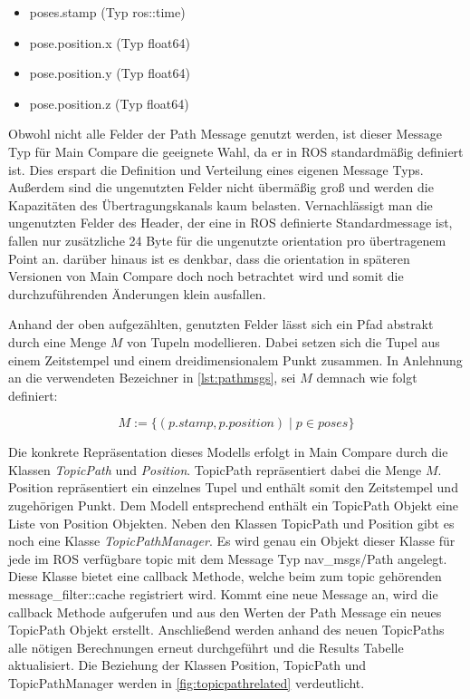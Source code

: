 \begin{itemize}
  \item poses.stamp (Typ ros::time)
  \item pose.position.x (Typ float64)
  \item pose.position.y (Typ float64)
  \item pose.position.z (Typ float64)
\end{itemize}

Obwohl nicht alle Felder der Path Message genutzt werden, ist dieser Message Typ
für Main Compare die geeignete Wahl, da er in ROS standardmäßig
definiert ist. Dies erspart die Definition und Verteilung eines
eigenen Message Typs. Außerdem sind die ungenutzten Felder nicht
übermäßig groß und werden die Kapazitäten des Übertragungskanals kaum belasten.
Vernachlässigt man die ungenutzten Felder des Header, der eine in ROS definierte Standardmessage ist, fallen nur
zusätzliche 24 Byte für die ungenutzte orientation pro übertragenem Point an.
darüber hinaus ist es denkbar, dass die orientation in späteren Versionen von
Main Compare doch noch betrachtet wird und somit die durchzuführenden
Änderungen klein ausfallen.

Anhand der oben aufgezählten, genutzten Felder lässt sich ein Pfad abstrakt durch eine Menge
$M$ von Tupeln modellieren. Dabei setzen sich die Tupel aus einem Zeitstempel und einem dreidimensionalem
Punkt zusammen. In Anlehnung an die verwendeten Bezeichner in
\autoref{lst:pathmsgs}, sei $M$ demnach wie folgt definiert:

\begin{equation*}
  \label{eqn:setdef}
  M := \{ (p.stamp , p.position) \mid p \in poses \}
\end{equation*}

Die konkrete Repräsentation dieses Modells erfolgt in Main Compare durch die
Klassen \textit{TopicPath} und \textit{Position}. TopicPath repräsentiert dabei
die Menge $M$. Position repräsentiert ein einzelnes Tupel und enthält somit den
Zeitstempel und zugehörigen Punkt. Dem Modell entsprechend enthält ein
TopicPath Objekt eine Liste von Position Objekten.  Neben den Klassen TopicPath
und Position gibt es noch eine Klasse \textit{TopicPathManager}. Es wird genau
ein Objekt dieser Klasse für jede im ROS verfügbare topic mit dem Message Typ
nav\_msgs/Path angelegt. Diese
Klasse bietet eine callback Methode, welche beim zum topic gehörenden
message\_filter::cache registriert wird. Kommt eine neue Message an, wird die
callback Methode aufgerufen und aus den Werten der Path Message ein neues
TopicPath Objekt erstellt. Anschließend werden anhand des neuen TopicPaths
alle nötigen Berechnungen erneut durchgeführt und die Results Tabelle
aktualisiert. Die Beziehung der Klassen Position, TopicPath und
TopicPathManager werden in \autoref{fig:topicpathrelated} verdeutlicht.

